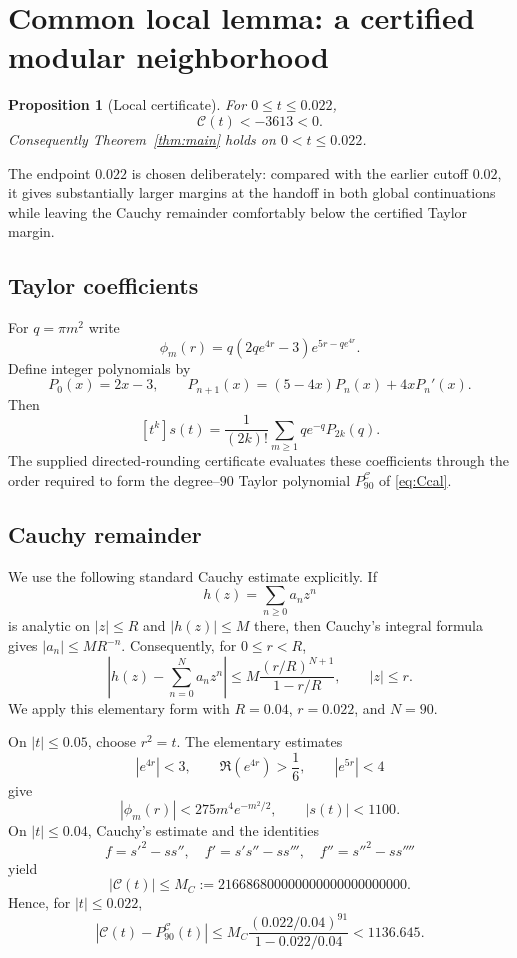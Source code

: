 \documentclass{amsart}
\numberwithin{equation}{section}
\newtheorem{proposition}[theorem]{Proposition}
\theoremstyle{definition}
\theoremstyle{remark}
\newcommand{\Ccal}{\mathcal C}
\begin{document}
\section{Common local lemma: a certified modular neighborhood}
\begin{proposition}[Local certificate]\label{prop:local}
For $0\le t\le0.022$,
\begin{equation}\label{eq:localconcl}
 \Ccal(t)<-3613<0.
\end{equation}
Consequently Theorem~\ref{thm:main} holds on $0<t\le0.022$.
\end{proposition}

The endpoint $0.022$ is chosen deliberately: compared with the earlier cutoff $0.02$, it gives substantially larger margins at the handoff in both global continuations while leaving the Cauchy remainder comfortably below the certified Taylor margin.

\subsection{Taylor coefficients}
For $q=\pi m^2$ write
\[
 \phi_m(r)=q(2qe^{4r}-3)e^{5r-qe^{4r}}.
\]
Define integer polynomials by
\begin{equation}\label{eq:Prec}
 P_0(x)=2x-3,\qquad
 P_{n+1}(x)=(5-4x)P_n(x)+4xP_n'(x).
\end{equation}
Then
\begin{equation}\label{eq:scoef}
 [t^k]s(t)=\frac1{(2k)!}\sum_{m\ge1}q e^{-q}P_{2k}(q).
\end{equation}
The supplied directed-rounding certificate evaluates these coefficients through the order required to form the degree--$90$ Taylor polynomial $P_{90}^{\Ccal}$ of \eqref{eq:Ccal}.

\subsection{Cauchy remainder}
We use the following standard Cauchy estimate explicitly. If
\[
 h(z)=\sum_{n\ge0}a_nz^n
\]
is analytic on $|z|\le R$ and $|h(z)|\le M$ there, then Cauchy's integral formula gives $|a_n|\le MR^{-n}$. Consequently, for $0\le r<R$,
\begin{equation}\label{eq:Cauchytail}
 \left|h(z)-\sum_{n=0}^{N}a_nz^n\right|
 \le M\frac{(r/R)^{N+1}}{1-r/R},\qquad |z|\le r.
\end{equation}
We apply this elementary form with $R=0.04$, $r=0.022$, and $N=90$.

On $|t|\le0.05$, choose $r^2=t$.  The elementary estimates
\[
 |e^{4r}|<3,\qquad \Re(e^{4r})>\frac16,\qquad |e^{5r}|<4
\]
give
\[
 |\phi_m(r)|<275m^4e^{-m^2/2},\qquad |s(t)|<1100.
\]
On $|t|\le0.04$, Cauchy's estimate and the identities
\[
 f=s'^2-ss'',\quad f'=s's''-ss''',\quad f''=s''^2-ss''''
\]
yield
\begin{equation}\label{eq:MC}
 |\Ccal(t)|\le M_C:=216686800000000000000000000.
\end{equation}
Hence, for $|t|\le0.022$,
\begin{equation}\label{eq:rem022}
 |\Ccal(t)-P_{90}^{\Ccal}(t)|
 \le M_C\frac{(0.022/0.04)^{91}}{1-0.022/0.04}
 <1136.645.
\end{equation}
\end{document}
